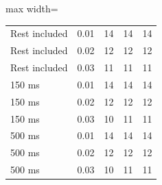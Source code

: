 \begin{table}[htbp]
\begin{adjustbox}{max width=\textwidth}
\begin{tabular}{lllll}
Rest included & 0.01 & 14 & 14 & 14\\
Rest included & 0.02 & 12 & 12 & 12\\
Rest included & 0.03 & 11 & 11 & 11\\
150 ms & 0.01 & 14 & 14 & 14\\
150 ms & 0.02 & 12 & 12 & 12\\
150 ms & 0.03 & 10 & 11 & 11\\
500 ms & 0.01 & 14 & 14 & 14\\
500 ms & 0.02 & 12 & 12 & 12\\
500 ms & 0.03 & 10 & 11 & 11\\
\bottomrule\end{tabular}
\end{adjustbox}
\end{table}
